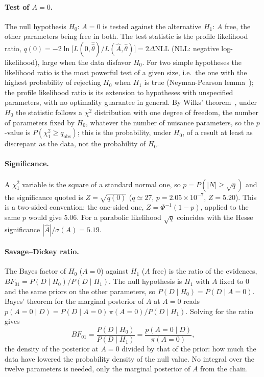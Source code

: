 \paragraph{Test of $A=0$.}
The null hypothesis $H_0$: $A=0$ is tested against the alternative $H_1$: $A$ free, the other parameters being free in both. The test statistic is the profile likelihood ratio,
$q(0)=-2\ln\big[L(0,\hat{\hat\theta})/L(\hat A,\hat\theta)\big]=2\Delta\mathrm{NLL}$ (NLL: negative log-likelihood), large when the data disfavor $H_0$. For two simple hypotheses the likelihood ratio is the most powerful test of a given size, i.e.\ the one with the highest probability of rejecting $H_0$ when $H_1$ is true (Neyman-Pearson lemma~\cite{neyman_pearson}); the profile likelihood ratio is its extension to hypotheses with unspecified parameters, with no optimality guarantee in general. By Wilks' theorem~\cite{wilks}, under $H_0$ the statistic follows a $\chi^2$ distribution with one degree of freedom, the number of parameters fixed by $H_0$, whatever the number of nuisance parameters, so the $p$-value is $P(\chi^2_1\geq q_{\mathrm{obs}})$; this is the probability, under $H_0$, of a result at least as discrepant as the data, not the probability of $H_0$.

\paragraph{Significance.}
A $\chi^2_1$ variable is the square of a standard normal one, so $p=P(|N|\geq\sqrt{q})$ and the significance quoted is $Z=\sqrt{q(0)}$ ($q\simeq27$, $p=2.05\times10^{-7}$, $Z=5.20$). This is a two-sided convention: the one-sided one, $Z=\Phi^{-1}(1-p)$, applied to the same $p$ would give $5.06$. For a parabolic likelihood $\sqrt{q}$ coincides with the Hesse significance $|\hat A|/\sigma(A)=5.19$.

\paragraph{Savage--Dickey ratio.}
The Bayes factor of $H_0$ ($A=0$) against $H_1$ ($A$ free) is the ratio of the evidences, $BF_{01}=P(D\mid H_0)/P(D\mid H_1)$. The null hypothesis is $H_1$ with $A$ fixed to $0$ and the same priors on the other parameters, so $P(D\mid H_0)=P(D\mid A=0)$. Bayes' theorem for the marginal posterior of $A$ at $A=0$ reads $p(A=0\mid D)=P(D\mid A=0)\,\pi(A=0)/P(D\mid H_1)$. Solving for the ratio gives
\[
BF_{01}=\frac{P(D\mid H_0)}{P(D\mid H_1)}=\frac{p(A=0\mid D)}{\pi(A=0)},
\]
the density of the posterior at $A=0$ divided by that of the prior: how much the data have lowered the probability density of the null value. No integral over the twelve parameters is needed, only the marginal posterior of $A$ from the chain.






